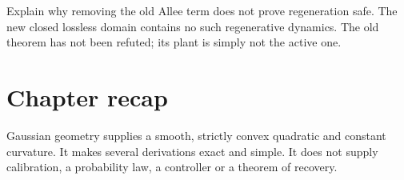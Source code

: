 Explain why removing the old Allee term does not prove regeneration safe.
The new closed lossless domain contains no such regenerative dynamics. The
old theorem has not been refuted; its plant is simply not the active one.

\section*{Chapter recap}
Gaussian geometry supplies a smooth, strictly convex quadratic and constant
curvature. It makes several derivations exact and simple. It does not supply
calibration, a probability law, a controller or a theorem of recovery.
